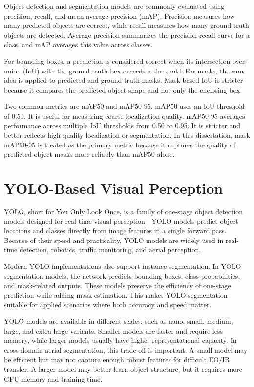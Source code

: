 Object detection and segmentation models are commonly evaluated using precision, recall, and mean average precision (mAP). Precision measures how many predicted objects are correct, while recall measures how many ground-truth objects are detected. Average precision summarizes the precision-recall curve for a class, and mAP averages this value across classes.

For bounding boxes, a prediction is considered correct when its intersection-over-union (IoU) with the ground-truth box exceeds a threshold. For masks, the same idea is applied to predicted and ground-truth masks. Mask-based IoU is stricter because it compares the predicted object shape and not only the enclosing box.

Two common metrics are mAP50 and mAP50-95. mAP50 uses an IoU threshold of 0.50. It is useful for measuring coarse localization quality. mAP50-95 averages performance across multiple IoU thresholds from 0.50 to 0.95. It is stricter and better reflects high-quality localization or segmentation. In this dissertation, mask mAP50-95 is treated as the primary metric because it captures the quality of predicted object masks more reliably than mAP50 alone.

\section{YOLO-Based Visual Perception}

YOLO, short for You Only Look Once, is a family of one-stage object detection models designed for real-time visual perception \cite{yolo2016}. YOLO models predict object locations and classes directly from image features in a single forward pass. Because of their speed and practicality, YOLO models are widely used in real-time detection, robotics, traffic monitoring, and aerial perception.

Modern YOLO implementations also support instance segmentation. In YOLO segmentation models, the network predicts bounding boxes, class probabilities, and mask-related outputs. These models preserve the efficiency of one-stage prediction while adding mask estimation. This makes YOLO segmentation suitable for applied scenarios where both accuracy and speed matter.

YOLO models are available in different scales, such as nano, small, medium, large, and extra-large variants. Smaller models are faster and require less memory, while larger models usually have higher representational capacity. In cross-domain aerial segmentation, this trade-off is important. A small model may be efficient but may not capture enough robust features for difficult EO/IR transfer. A larger model may better learn object structure, but it requires more GPU memory and training time.

